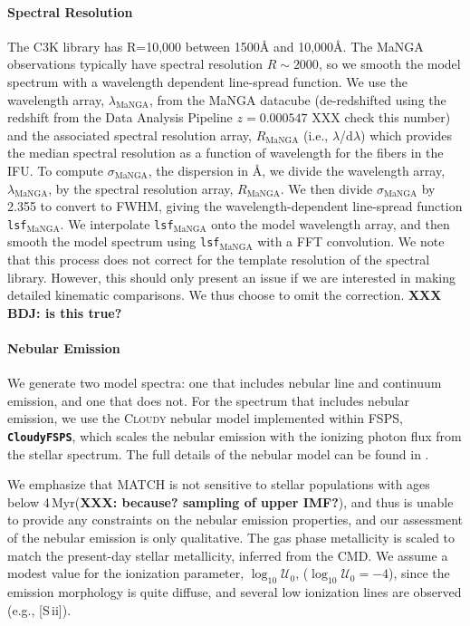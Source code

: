 \documentclass[preprint2]{aastex62}
\newcommand{\FSPS}{{\sc FSPS}\xspace}
\newcommand{\CloudyFSPS}{{\tt \textbf{CloudyFSPS}}\xspace}
\newcommand{\Cloudy}{\textsc{Cloudy}\xspace}
\newcommand{\sii}{[S\,{\sc ii}]\xspace}
\newcommand{\logten}{\ensuremath{\log_{10}}}
\newcommand{\ang}{\ensuremath{\mbox{\AA}}\xspace}
\newcommand{\logU}{\ensuremath{\logten \mathcal{U}_0}}
\newcommand{\logUeq}[1]{\ensuremath{\logten \mathcal{U}_0 = #1}}
\newcommand{\Myr}{$\,$Myr\xspace}
\begin{document}
\paragraph{Spectral Resolution}

The C3K library has R=10,000 between 1500\ang and 10,000\ang. The MaNGA observations typically have spectral resolution $R\sim2000$, so we smooth the model spectrum with a wavelength dependent line-spread function. We use the wavelength array, $\lambda_{\mathrm{MaNGA}}$, from the MaNGA datacube (de-redshifted using the redshift from the Data Analysis Pipeline $z=0.000547$ XXX check this number) and the associated spectral resolution array, $R_{\mathrm{MaNGA}}$ (i.e., $\lambda$/d$\lambda$) which provides the median spectral resolution as a function of wavelength for the fibers in the IFU. To compute $\sigma_{\mathrm{MaNGA}}$, the dispersion in \ang, we divide the wavelength array, $\lambda_{\mathrm{MaNGA}}$, by the spectral resolution array, $R_{\mathrm{MaNGA}}$. We then divide $\sigma_{\mathrm{MaNGA}}$ by 2.355 to convert to FWHM, giving the wavelength-dependent line-spread function {\tt lsf}$_{\mathrm{MaNGA}}$. We interpolate {\tt lsf}$_{\mathrm{MaNGA}}$ onto the model wavelength array, and then smooth the model spectrum using {\tt lsf}$_{\mathrm{MaNGA}}$ with a FFT convolution. We note that this process does not correct for the template resolution of the spectral library. However, this should only present an issue if we are interested in making detailed kinematic comparisons. We thus choose to omit the correction. \textbf{XXX BDJ: is this true?}
 
\paragraph{Nebular Emission}

We generate two model spectra: one that includes nebular line and continuum emission, and one that does not. For the spectrum that includes nebular emission, we use the \Cloudy nebular model implemented within \FSPS, \CloudyFSPS \citep{cloudyFSPSv1}, which scales the nebular emission with the ionizing photon flux from the stellar spectrum. The full details of the nebular model can be found in \citet{Byler+2017}.

We emphasize that MATCH is not sensitive to stellar populations with ages below 4\Myr (\textbf{XXX: because? sampling of upper IMF?}), and thus is unable to provide any constraints on the nebular emission properties, and our assessment of the nebular emission is only qualitative. The gas phase metallicity is scaled to match the present-day stellar metallicity, inferred from the CMD. We assume a modest value for the ionization parameter, \logU, (\logUeq{-4}), since the emission morphology is quite diffuse, and several low ionization lines are observed (e.g., \sii).
\end{document}
